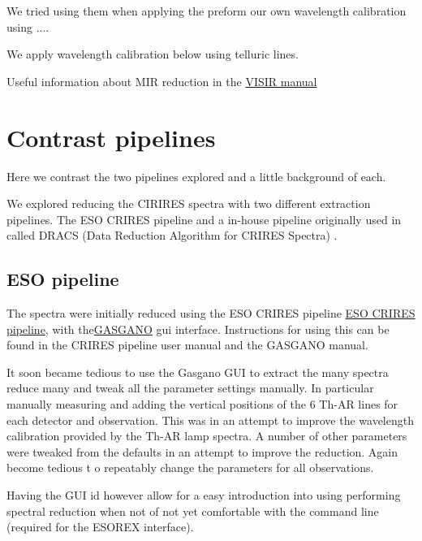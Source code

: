 We tried using them when applying the preform our own wavelength calibration using ....

We apply wavelength calibration below using telluric lines.



Useful information about MIR reduction in the 
\href{https://www.eso.org/sci/facilities/paranal/instruments/visir/doc/VLT-MAN-ESO-14300-3514_2018-02-01.pdf}{VISIR manual}


\section{Contrast pipelines}

Here we contrast the two pipelines explored and a little background of each.

We explored reducing the CIRIRES spectra with two different extraction pipelines. The ESO CRIRES pipeline and a in-house pipeline originally used in \citet{figueira_radial_2010} called DRACS (Data Reduction Algorithm for CRIRES Spectra) .


\subsection{ESO pipeline}

The spectra were initially reduced using the ESO CRIRES pipeline \href{ESO CRIRES pipeline}{ESO CRIRES pipeline}, with the\href{https://www.eso.org/sci/software/gasgano.html}{GASGANO} gui interface.  Instructions for using this can be found in the CRIRES pipeline user manual and the GASGANO manual.


It soon became tedious to use the Gasgano GUI to extract the many spectra reduce many and tweak all the parameter settings manually. In particular manually measuring and adding the vertical positions of the 6 Th-AR lines for each detector and observation. This was in an attempt to improve the wavelength calibration provided by the Th-AR lamp spectra.
A number of other parameters were tweaked from the defaults in an attempt to  improve the reduction. Again become tedious t o repeatably change the parameters for all observations.

Having the GUI id however allow for a easy introduction into using performing spectral reduction when not of not yet comfortable with the command line (required for the ESOREX interface).


